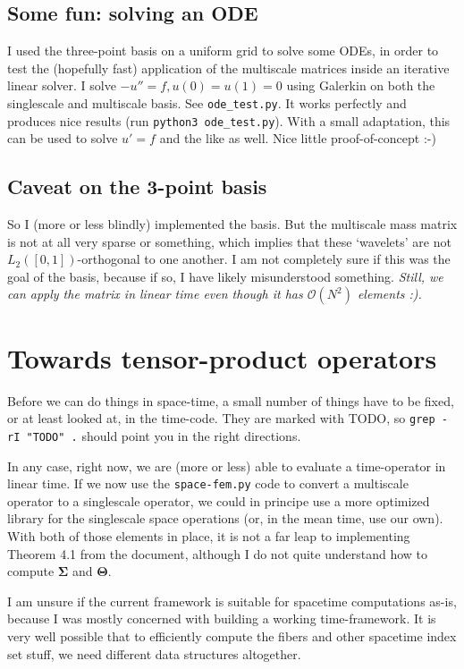 \documentclass[11pt,a4paper]{amsart}
\theoremstyle{definition}
\begin{document}
\subsection{Some fun: solving an ODE}
I used the three-point basis on a uniform grid to solve some ODEs, in order
to test the (hopefully fast) application of the multiscale matrices inside an
iterative linear solver. I solve $-u'' = f, u(0) = u(1) = 0$ using Galerkin on
both the singlescale and multiscale basis. See \texttt{ode\_test.py}. It works
perfectly and produces nice results (run \texttt{python3 ode\_test.py}). With a
small adaptation, this can be used to solve $u' = f$ and the like as well. Nice
little proof-of-concept :-)

\subsection{Caveat on the 3-point basis}
So I (more or less blindly) implemented the basis. But the multiscale mass matrix
is not at all very sparse or something, which implies that these `wavelets' are
not $L_2([0,1])$-orthogonal to one another. I am not completely sure if this was
the goal of the basis, because if so, I have likely misunderstood something.
\emph{Still, we can apply the matrix in linear time even though it has $\mathcal O(N^2)$
elements :).}

\section{Towards tensor-product operators}
Before we can do things in space-time, a small number of things have to be fixed,
or at least looked at, in the time-code. They are marked with TODO, so
\texttt{grep -rI "TODO" .} should point you in the right directions.

In any case, right now, we are (more or less) able to evaluate a time-operator
in linear time. If we now use the \texttt{space-fem.py} code to convert a
multiscale operator to a singlescale operator, we could in principe use a more
optimized library for the singlescale space operations (or, in the mean time,
use our own). With both of those elements in place, it is not a far leap to
implementing Theorem 4.1 from the document, although I do not quite understand
how to compute $\bm \Sigma$ and $\bm \Theta$.

I am unsure if the current framework is suitable for spacetime computations
as-is, because I was mostly concerned with building a working time-framework.
It is very well possible that to efficiently compute the fibers and other
spacetime index set stuff, we need different data structures altogether.
\end{document}

